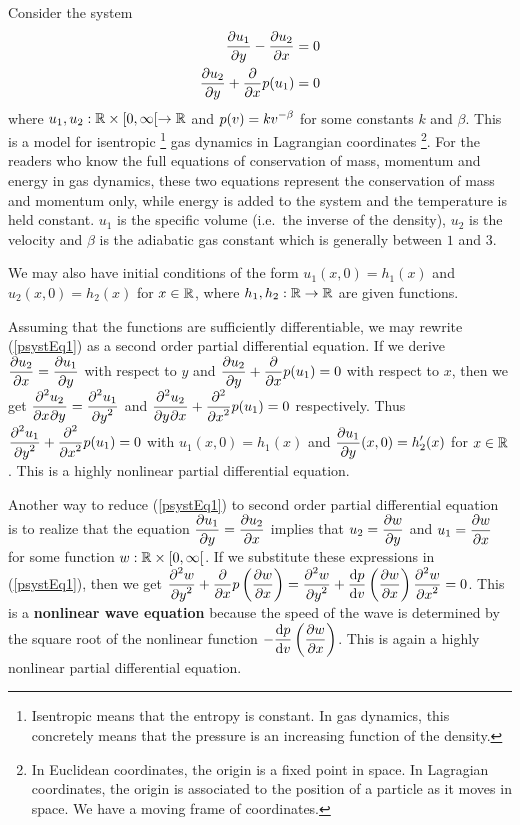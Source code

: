 \begin{egg}   \label{eggPsystem}
Consider the system
\begin{equation} \label{psystEq1}
\begin{split}
\pdydx{u_1}{y} - \pdydx{u_2}{x} &= 0 \\
\pdydx{u_2}{y} + \pdfdx{p(u_1)}{x} &= 0
\end{split}
\end{equation}
where $u_1,u_2: \RR\times[0,\infty[ \to \RR$ and
$\DS p(v) = kv^{-\beta}$ for some constants $k$ and
$\beta$.  This is a model for isentropic \footnote{Isentropic means that the
entropy is constant.  In gas dynamics, this concretely means that the
pressure is an increasing function of the density.} gas dynamics in
Lagrangian coordinates \footnote{In Euclidean coordinates, the origin
is a fixed point in space.  In Lagragian coordinates, the origin is
associated to the position of a particle as it moves in space.  We
have a moving frame of coordinates.}.
For the readers who know the full equations of conservation
of mass, momentum and energy in gas dynamics, these two equations
represent the conservation of mass and momentum only, while energy is added
to the system and the temperature is held constant.
$u_1$ is the specific volume (i.e.\ the inverse of the density),
$u_2$ is the velocity and $\beta$ is the adiabatic gas constant which is
generally between $1$ and $3$.

We may also have initial conditions of the form
$u_1(x,0) = h_1(x)$ and $u_2(x,0) = h_2(x)$ for $x \in\RR$, where
$h_1,h_2:\RR\to\RR$ are given functions.

Assuming that the functions are sufficiently differentiable, we may
rewrite (\ref{psystEq1}) as a second order partial differential
equation.  If we derive $\DS \pdydx{u_2}{x} = \pdydx{u_1}{y}$
with respect to $y$ and
$\DS \pdydx{u_2}{y} + \pdfdx{p(u_1)}{x} = 0$ with respect to
$x$, then we get
$\DS \pdydxnm{u_2}{x}{y}{2}{}{} = \pdydxn{u_1}{y}{2}$
and
$\DS \pdydxnm{u_2}{y}{x}{2}{}{} + \pdfdxn{p(u_1)}{x}{2} = 0$
respectively.  Thus
$\DS \pdydxn{u_1}{y}{2} + \pdfdxn{p(u_1)}{x}{2} = 0$ with
$u_1(x,0) = h_1(x)$ and $\DS \pdydx{u_1}{y}(x,0) = h_2'(x)$ for
$x\in \RR$.  This is a highly nonlinear partial differential equation.

Another way to reduce (\ref{psystEq1}) to second order partial differential
equation is to realize that the equation
$\DS \pdydx{u_1}{y} = \pdydx{u_2}{x}$ implies that
$\DS u_2 = \pdydx{w}{y}$ and
$\DS u_1 = \pdydx{w}{x}$ for some function $w:\RR\times [0,\infty[$.
If we substitute these expressions in (\ref{psystEq1}), then we get
$\DS \pdydxn{w}{y}{2} +
\pdfdx{p\left(\pdydx{w}{x}\right)}{x}
= \pdydxn{w}{y}{2} + \dydx{p}{v}\left(\pdydx{w}{x}\right)
\pdydxn{w}{x}{2} = 0$.
This is a {\bfseries nonlinear wave equation}
because the speed of the wave is determined by the square root of the
nonlinear function $\DS -\dydx{p}{v}\left(\pdydx{w}{x}\right)$.
This is again a highly nonlinear partial differential equation.


\end{egg}
